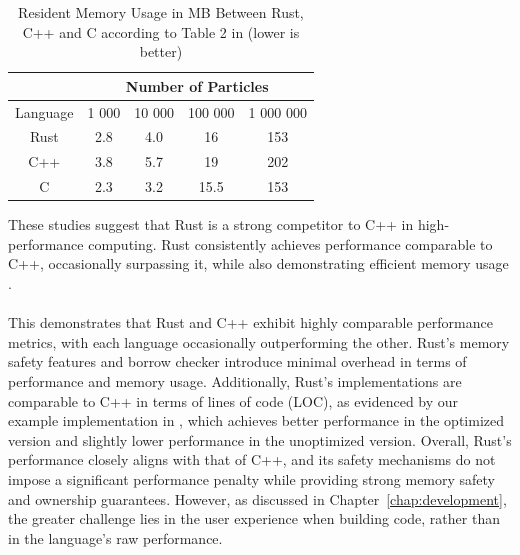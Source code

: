 \begin{table}[H]
    \centering
    \begin{tabular}{|c|c|c|c|c|}
        \hline
        & \multicolumn{4}{c|}{Number of Particles} \\  
        \hline
        Language & 1 000 & 10 000 & 100 000 & 1 000 000 \\
        \hline
        Rust & 2.8 & 4.0 & 16 & 153 \\
        C++ & 3.8 & 5.7 & 19 & 202 \\
        C & 2.3 & 3.2 & 15.5 & 153 \\
        \hline
    \end{tabular}
    \caption{Resident Memory Usage in MB Between Rust, C++ and C according to Table 2 in \cite[]{rotterNBodyPerformanceKDTree2022} (lower is better)}
    \label{tab:performance_2}
\end{table}

These studies suggest that Rust is a strong competitor to C++ in high-performance computing. Rust consistently achieves performance comparable to C++, occasionally surpassing it, while also demonstrating efficient memory usage \cite[]{rotterNBodyPerformanceKDTree2022}.

\paragraph{}

This demonstrates that Rust and C++ exhibit highly comparable performance metrics, with each language occasionally outperforming the other. Rust's memory safety features and borrow checker introduce minimal overhead in terms of performance and memory usage. Additionally, Rust's implementations are comparable to C++ in terms of lines of code (LOC), as evidenced by our example implementation in \cite[]{sColfrozenlIquidBenchmark2025}, which achieves better performance in the optimized version and slightly lower performance in the unoptimized version. Overall, Rust's performance closely aligns with that of C++, and its safety mechanisms do not impose a significant performance penalty while providing strong memory safety and ownership guarantees. However, as discussed in Chapter~\ref{chap:development}, the greater challenge lies in the user experience when building code, rather than in the language's raw performance.